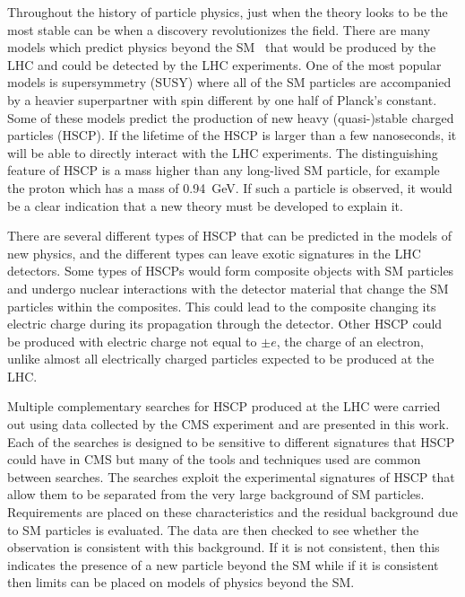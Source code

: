 Throughout the history of particle physics, just when the theory looks to be the most stable can be when a discovery revolutionizes the field.
There are many models which predict physics beyond the SM~\cite{Martin:1997ns, Tata:1997uf} 
that would be produced by the LHC and could be detected by the LHC experiments.
One of the most popular models is supersymmetry (SUSY) where all of the SM particles are accompanied by a heavier superpartner with spin different by one half
of Planck's constant.
Some of these models predict the production of new heavy (quasi-)stable charged particles (HSCP). 
If the lifetime of the HSCP is larger than a few nanoseconds, it will be able to directly interact with the LHC experiments.
The distinguishing feature of HSCP is a mass higher than any long-lived SM particle, for example the proton which has a mass of 0.94~GeV.
If such a particle is observed, it would be a clear indication that a new theory must be developed to explain it.

There are several different types of HSCP that can be predicted in the models of new physics, and the different types can leave exotic signatures in the LHC detectors.
Some types of HSCPs would form composite objects with SM particles and undergo nuclear interactions with the detector material
that change the SM particles within the composites. This could lead to the composite changing its electric charge during its propagation through the detector.
Other HSCP could be produced with electric charge not equal to $\pm e$, the charge of an electron, unlike almost all electrically charged particles 
expected to be produced at the LHC.

Multiple complementary searches for HSCP produced at the LHC were carried out using data collected by the CMS experiment and are presented in this work.
Each of the searches is designed to be sensitive to different signatures that HSCP could have in CMS but many of the tools and techniques used are
common between searches. The searches exploit the experimental signatures of HSCP that allow them to be separated from the very large background of SM particles.
Requirements are placed on these characteristics and the residual background due to SM particles is evaluated. The data are then checked to see whether
the observation is consistent with this background. If it is not consistent, then this indicates the presence of a new particle beyond the SM while if it
is consistent then limits can be placed on models of physics beyond the SM.

